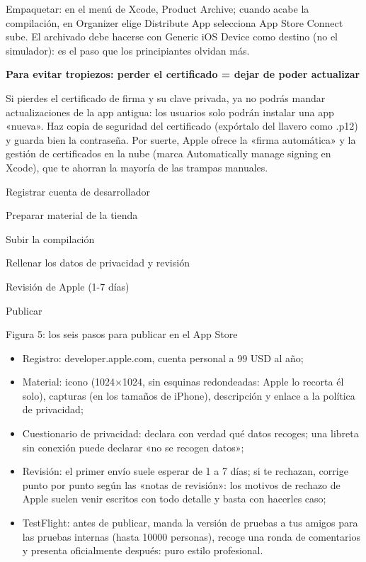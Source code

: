 Empaquetar: en el menú de Xcode, Product Archive; cuando acabe la compilación, en Organizer elige Distribute App selecciona App Store Connect sube. El archivado debe hacerse con Generic iOS Device como destino (no el simulador): es el paso que los principiantes olvidan más.

\textbf{Para evitar tropiezos: perder el certificado = dejar de poder actualizar}\par

Si pierdes el certificado de firma y su clave privada, ya no podrás mandar actualizaciones de la app antigua: los usuarios solo podrán instalar una app «nueva». Haz copia de seguridad del certificado (expórtalo del llavero como .p12) y guarda bien la contraseña. Por suerte, Apple ofrece la «firma automática» y la gestión de certificados en la nube (marca Automatically manage signing en Xcode), que te ahorran la mayoría de las trampas manuales.


Registrar cuenta de desarrollador

Preparar material de la tienda

Subir la compilación

Rellenar los datos de privacidad y revisión

Revisión de Apple (1-7 días)

Publicar

\begin{center}\small\color{gray}Figura 5: los seis pasos para publicar en el App Store\end{center}

\begin{itemize}
  \item Registro: developer.apple.com, cuenta personal a 99 USD al año;
  \item Material: icono (1024×1024, sin esquinas redondeadas: Apple lo recorta él solo), capturas (en los tamaños de iPhone), descripción y enlace a la política de privacidad;
  \item Cuestionario de privacidad: declara con verdad qué datos recoges; una libreta sin conexión puede declarar «no se recogen datos»;
  \item Revisión: el primer envío suele esperar de 1 a 7 días; si te rechazan, corrige punto por punto según las «notas de revisión»: los motivos de rechazo de Apple suelen venir escritos con todo detalle y basta con hacerles caso;
  \item TestFlight: antes de publicar, manda la versión de pruebas a tus amigos para las pruebas internas (hasta 10000 personas), recoge una ronda de comentarios y presenta oficialmente después: puro estilo profesional.
\end{itemize}

